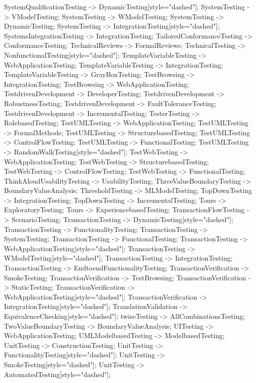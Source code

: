 \documentclass{article}
\begin{document}
{SystemQualificationTesting -> DynamicTesting[style="dashed"];
SystemTesting -> VModelTesting;
SystemTesting -> WModelTesting;
SystemTesting -> DynamicTesting;
SystemTesting -> IntegrationTesting[style="dashed"];
SystemsIntegrationTesting -> IntegrationTesting;
TailoredConformanceTesting -> ConformanceTesting;
TechnicalReviews -> FormalReviews;
TechnicalTesting -> NonfunctionalTesting[style="dashed"];
TemplateVariableTesting -> WebApplicationTesting;
TemplateVariableTesting -> IntegrationTesting;
TemplateVariableTesting -> GrayBoxTesting;
TestBrowsing -> IntegrationTesting;
TestBrowsing -> WebApplicationTesting;
TestdrivenDevelopment -> DeveloperTesting;
TestdrivenDevelopment -> RobustnessTesting;
TestdrivenDevelopment -> FaultToleranceTesting;
TestdrivenDevelopment -> IncrementalTesting;
TesterTesting -> RolebasedTesting;
TestUMLTesting -> WebApplicationTesting;
TestUMLTesting -> FormalMethods;
TestUMLTesting -> StructurebasedTesting;
TestUMLTesting -> ControlFlowTesting;
TestUMLTesting -> FunctionalTesting;
TestUMLTesting -> RandomWalkTesting[style="dashed"];
TestWebTesting -> WebApplicationTesting;
TestWebTesting -> StructurebasedTesting;
TestWebTesting -> ControlFlowTesting;
TestWebTesting -> FunctionalTesting;
ThinkAloudUsabilityTesting -> UsabilityTesting;
ThreeValueBoundaryTesting -> BoundaryValueAnalysis;
ThresholdTesting -> MLModelTesting;
TopDownTesting -> IntegrationTesting;
TopDownTesting -> IncrementalTesting;
Tours -> ExploratoryTesting;
Tours -> ExperiencebasedTesting;
TransactionFlowTesting -> ScenarioTesting;
TransactionTesting -> DynamicTesting[style="dashed"];
TransactionTesting -> FunctionalityTesting;
TransactionTesting -> SystemTesting;
TransactionTesting -> FunctionalTesting;
TransactionTesting -> WebApplicationTesting[style="dashed"];
TransactionTesting -> WModelTesting[style="dashed"];
TransactionTesting -> IntegrationTesting;
TransactionTesting -> EndtoendFunctionalityTesting;
TransactionVerification -> SmokeTesting;
TransactionVerification -> TestBrowsing;
TransactionVerification -> StaticTesting;
TransactionVerification -> WebApplicationTesting[style="dashed"];
TransactionVerification -> IntegrationTesting[style="dashed"];
TranslationValidation -> EquivalenceChecking[style="dashed"];
twiseTesting -> AllCombinationsTesting;
TwoValueBoundaryTesting -> BoundaryValueAnalysis;
UITesting -> WebApplicationTesting;
UMLModelbasedTesting -> ModelbasedTesting;
UnitTesting -> ConstructionTesting;
UnitTesting -> FunctionalityTesting[style="dashed"];
UnitTesting -> SmokeTesting[style="dashed"];
UnitTesting -> AutomatedTesting[style="dashed"];
}
\end{document}
